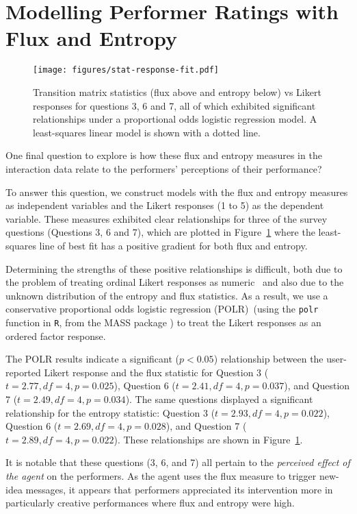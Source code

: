 \documentclass{sigchi}
\begin{document}
\section{Modelling Performer Ratings with Flux and Entropy}

\begin{figure}
  \centering
  \texttt{[image: figures/stat-response-fit.pdf]}
  \caption{Transition matrix statistics (flux above and entropy below) vs Likert responses for
    questions 3, 6 and 7, all of which exhibited significant
    relationships under a proportional odds logistic regression model.
    A least-squares linear model is shown with a dotted line.
    \label{fig:stat-response-fit}}
\end{figure}

One final question to explore is how these flux and entropy measures
in the interaction data relate to the performers' perceptions of their
performance?

To answer this question, we construct models with the flux and entropy
measures as independent variables and the Likert responses (1 to 5) as
the dependent variable. These measures exhibited clear relationships
for three of the survey questions (Questions 3, 6 and 7), which are
plotted in Figure~\ref{fig:stat-response-fit} where the least-squares
line of best fit has a positive gradient for both flux and entropy.

Determining the strengths of these positive relationships is
difficult, both due to the problem of treating ordinal Likert
responses as numeric~\cite{Gardner:2007fj} and also
due to the unknown distribution of the entropy and flux statistics. As
a result, we use a conservative proportional odds logistic regression
(POLR)~(using the \texttt{polr} function in \texttt{R}, from the MASS
package \cite{Venables:2002qv}) to treat the Likert responses as an
ordered factor response.

The POLR results indicate a significant ($p<0.05$) relationship
between the user-reported Likert response and the flux statistic for
Question 3 ($t = 2.77, df = 4, p = 0.025$), Question 6
($t = 2.41, df = 4, p = 0.037$), and Question 7
($t = 2.49, df = 4, p = 0.034$). The same questions displayed a
significant relationship for the entropy statistic: Question 3
($t = 2.93, df = 4, p = 0.022$), Question 6
($t = 2.69, df = 4, p = 0.028$), and Question 7
($t = 2.89, df = 4, p = 0.022$). These relationships are shown in
Figure~\ref{fig:stat-response-fit}.

It is notable that these questions (3, 6, and 7) all pertain to the
\emph{perceived effect of the agent} on the performers. As the agent
uses the flux measure to trigger new-idea messages, it appears that
performers appreciated its intervention more in particularly creative
performances where flux and entropy were high.








\end{document}
